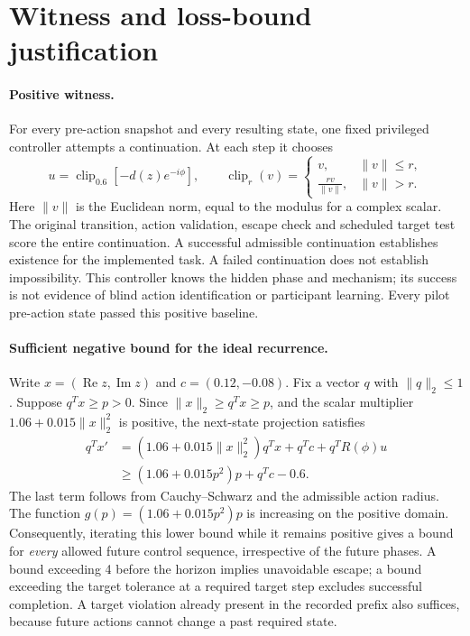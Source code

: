 \section{Witness and loss-bound justification}
\label{app:bounds}
\paragraph{Positive witness.}
For every pre-action snapshot and every resulting state, one fixed privileged controller attempts a continuation. At each step it chooses
\begin{equation}
 u=\operatorname{clip}_{0.6}\!\left[-d(z)e^{-i\phi}\right],\qquad
 \operatorname{clip}_{r}(v)=
 \begin{cases}
   v, & \lVert v\rVert\leq r,\\[3pt]
   \displaystyle\frac{r v}{\lVert v\rVert}, & \lVert v\rVert>r.
 \end{cases}
\end{equation}
Here $\lVert v\rVert$ is the Euclidean norm, equal to the modulus for a complex scalar.
The original transition, action validation, escape check and scheduled target test score the entire continuation. A successful admissible continuation establishes existence for the implemented task. A failed continuation does not establish impossibility. This controller knows the hidden phase and mechanism; its success is not evidence of blind action identification or participant learning. Every pilot pre-action state passed this positive baseline.

\paragraph{Sufficient negative bound for the ideal recurrence.}
Write \(x = (\operatorname{Re} z, \operatorname{Im} z)\) and $c=(0.12,-0.08)$. Fix a vector $q$ with $\|q\|_2\leq1$. Suppose $q^Tx\geq p>0$. Since $\|x\|_2\geq q^Tx\geq p$, and the scalar multiplier $1.06+0.015\|x\|_2^2$ is positive, the next-state projection satisfies
\begin{align}
q^Tx'&=(1.06+0.015\|x\|_2^2)q^Tx+q^Tc+q^TR(\phi)u\\
&\geq (1.06+0.015p^2)p+q^Tc-0.6.
\end{align}
The last term follows from Cauchy--Schwarz and the admissible action radius. The function $g(p)=(1.06+0.015p^2)p$ is increasing on the positive domain. Consequently, iterating this lower bound while it remains positive gives a bound for \emph{every} allowed future control sequence, irrespective of the future phases. A bound exceeding 4 before the horizon implies unavoidable escape; a bound exceeding the target tolerance at a required target step excludes successful completion. A target violation already present in the recorded prefix also suffices, because future actions cannot change a past required state.

